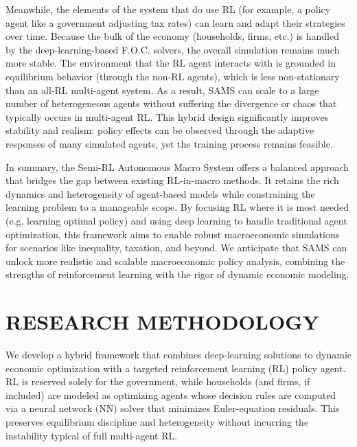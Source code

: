 \documentclass[11pt]{article}
\begin{document}
Meanwhile, the elements of the system that do use RL (for example, a policy agent like a government adjusting tax rates) can learn and adapt their strategies over time. Because the bulk of the economy (households, firms, etc.) is handled by the deep-learning-based F.O.C. solvers, the overall simulation remains much more stable. The environment that the RL agent interacts with is grounded in equilibrium behavior (through the non-RL agents), which is less non-stationary than an all-RL multi-agent system. As a result, SAMS can scale to a large number of heterogeneous agents without suffering the divergence or chaos that typically occurs in multi-agent RL. This hybrid design significantly improves stability and realism: policy effects can be observed through the adaptive responses of many simulated agents, yet the training process remains feasible. 

In summary, the Semi-RL Autonomous Macro System offers a balanced approach that bridges the gap between existing RL-in-macro methods. It retains the rich dynamics and heterogeneity of agent-based models while constraining the learning problem to a manageable scope. By focusing RL where it is most needed (e.g. learning optimal policy) and using deep learning to handle traditional agent optimization, this framework aims to enable robust macroeconomic simulations for scenarios like inequality, taxation, and beyond. We anticipate that SAMS can unlock more realistic and scalable macroeconomic policy analysis, combining the strengths of reinforcement learning with the rigor of dynamic economic modeling.


\section{RESEARCH METHODOLOGY}

We develop a hybrid framework that combines deep-learning solutions to dynamic economic optimization with a targeted reinforcement learning (RL) policy agent. RL is reserved solely for the government, while households (and firms, if included) are modeled as optimizing agents whose decision rules are computed via a neural network (NN) solver that minimizes Euler-equation residuals. This preserves equilibrium discipline and heterogeneity without incurring the instability typical of full multi-agent RL.
\end{document}
